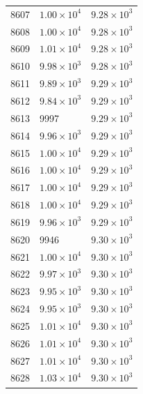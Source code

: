 \begin{table}[H]
\begin{tabular}{lll}
8607 & $\displaystyle 1.00 \times 10^{4}$ & $\displaystyle 9.28 \times 10^{3}$ \\
8608 & $\displaystyle 1.00 \times 10^{4}$ & $\displaystyle 9.28 \times 10^{3}$ \\
8609 & $\displaystyle 1.01 \times 10^{4}$ & $\displaystyle 9.28 \times 10^{3}$ \\
8610 & $\displaystyle 9.98 \times 10^{3}$ & $\displaystyle 9.28 \times 10^{3}$ \\
8611 & $\displaystyle 9.89 \times 10^{3}$ & $\displaystyle 9.29 \times 10^{3}$ \\
8612 & $\displaystyle 9.84 \times 10^{3}$ & $\displaystyle 9.29 \times 10^{3}$ \\
8613 & 9997 & $\displaystyle 9.29 \times 10^{3}$ \\
8614 & $\displaystyle 9.96 \times 10^{3}$ & $\displaystyle 9.29 \times 10^{3}$ \\
8615 & $\displaystyle 1.00 \times 10^{4}$ & $\displaystyle 9.29 \times 10^{3}$ \\
8616 & $\displaystyle 1.00 \times 10^{4}$ & $\displaystyle 9.29 \times 10^{3}$ \\
8617 & $\displaystyle 1.00 \times 10^{4}$ & $\displaystyle 9.29 \times 10^{3}$ \\
8618 & $\displaystyle 1.00 \times 10^{4}$ & $\displaystyle 9.29 \times 10^{3}$ \\
8619 & $\displaystyle 9.96 \times 10^{3}$ & $\displaystyle 9.29 \times 10^{3}$ \\
8620 & 9946 & $\displaystyle 9.30 \times 10^{3}$ \\
8621 & $\displaystyle 1.00 \times 10^{4}$ & $\displaystyle 9.30 \times 10^{3}$ \\
8622 & $\displaystyle 9.97 \times 10^{3}$ & $\displaystyle 9.30 \times 10^{3}$ \\
8623 & $\displaystyle 9.95 \times 10^{3}$ & $\displaystyle 9.30 \times 10^{3}$ \\
8624 & $\displaystyle 9.95 \times 10^{3}$ & $\displaystyle 9.30 \times 10^{3}$ \\
8625 & $\displaystyle 1.01 \times 10^{4}$ & $\displaystyle 9.30 \times 10^{3}$ \\
8626 & $\displaystyle 1.01 \times 10^{4}$ & $\displaystyle 9.30 \times 10^{3}$ \\
8627 & $\displaystyle 1.01 \times 10^{4}$ & $\displaystyle 9.30 \times 10^{3}$ \\
8628 & $\displaystyle 1.03 \times 10^{4}$ & $\displaystyle 9.30 \times 10^{3}$ \\

\end{tabular}
\end{table}
